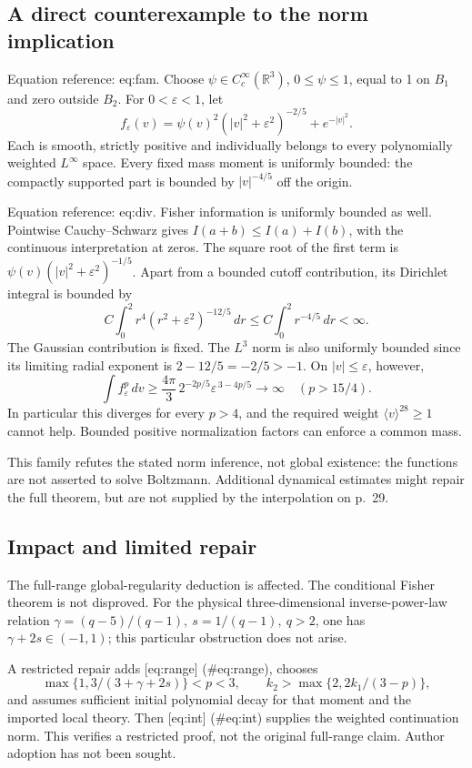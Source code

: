 \documentclass[10pt]{article}
\begin{document}
\subsection*{A direct counterexample to the norm implication}
Equation reference: eq:fam. Choose \(\psi\in C_c^\infty(\mathbb R^3)\), \(0\leq\psi\leq1\), equal to 1 on \(B_1\) and zero outside \(B_2\). For \(0<\varepsilon<1\), let \[
 f_\varepsilon(v)=\psi(v)^2(|v|^2+\varepsilon^2)^{-2/5}+e^{-|v|^2}.\] Each is smooth, strictly positive and individually belongs to every polynomially weighted \(L^\infty\) space. Every fixed mass moment is uniformly bounded: the compactly supported part is bounded by \(|v|^{-4/5}\) off the origin.\par
Equation reference: eq:div. Fisher information is uniformly bounded as well. Pointwise Cauchy–Schwarz gives \(I(a+b)\leq I(a)+I(b)\), with the continuous interpretation at zeros. The square root of the first term is \(\psi(v)(|v|^2+\varepsilon^2)^{-1/5}\). Apart from a bounded cutoff contribution, its Dirichlet integral is bounded by \[C\int_0^2r^4(r^2+\varepsilon^2)^{-12/5}\,dr
 \leq C\int_0^2r^{-4/5}\,dr<\infty .\] The Gaussian contribution is fixed. The \(L^3\) norm is also uniformly bounded since its limiting radial exponent is \(2-12/5=-2/5>-1\). On \(|v|\leq\varepsilon\), however, \[
 \int f_\varepsilon^p\,dv\geq
 \frac{4\pi}{3}\,2^{-2p/5}\varepsilon^{\,3-4p/5}\longrightarrow\infty
 \quad(p>15/4).\] In particular this diverges for every \(p>4\), and the required weight \(\langle v\rangle^{28}\geq1\) cannot help. Bounded positive normalization factors can enforce a common mass.\par
This family refutes the stated norm inference, not global existence: the functions are not asserted to solve Boltzmann. Additional dynamical estimates might repair the full theorem, but are not supplied by the interpolation on p. 29.\par
\subsection*{Impact and limited repair}
The full-range global-regularity deduction is affected. The conditional Fisher theorem is not disproved. For the physical three-dimensional inverse-power-law relation \(\gamma=(q-5)/(q-1),\ s=1/(q-1),\ q>2\), one has \(\gamma+2s\in(-1,1)\); this particular obstruction does not arise.\par
A restricted repair adds [eq:range] (\#eq:range), chooses \[\max\{1,3/(3+\gamma+2s)\}<p<3,\qquad
 k_2>\max\{2,2k_1/(3-p)\},\] and assumes sufficient initial polynomial decay for that moment and the imported local theory. Then [eq:int] (\#eq:int) supplies the weighted continuation norm. This verifies a restricted proof, not the original full-range claim. Author adoption has not been sought.\par
\end{document}
